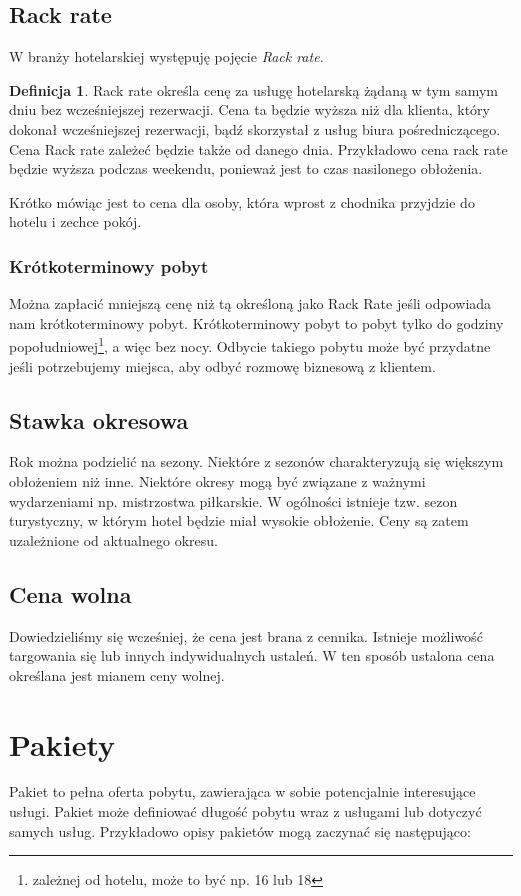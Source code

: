 \documentclass[a4paper,onecolumn,oneside,11pt,wide,floatssmall]{mwrep}
\theoremstyle{definition}
\newtheorem{defn}{Definicja}[section]
\theoremstyle{plain}%
\theoremstyle{remark}
\begin{document}
\subsection{Rack rate}
W branży hotelarskiej występuję pojęcie \emph{Rack rate}.

\begin{defn}{Rack rate}
określa cenę za usługę hotelarską żądaną w tym samym dniu bez wcześniejszej 
rezerwacji. Cena ta będzie wyższa niż dla klienta, który dokonał 
wcześniejszej rezerwacji, bądź skorzystał z usług biura pośredniczącego. 
Cena Rack rate zależeć będzie także od danego dnia. Przykładowo cena rack 
rate będzie wyższa podczas weekendu, ponieważ jest to czas nasilonego 
obłożenia.
\end{defn}

Krótko mówiąc jest to cena dla osoby, która wprost z chodnika przyjdzie do 
hotelu i zechce pokój.

\subsubsection{Krótkoterminowy pobyt}
Można zapłacić mniejszą cenę niż tą określoną jako Rack Rate jeśli odpowiada 
nam krótkoterminowy pobyt. Krótkoterminowy pobyt to pobyt tylko do godziny 
popołudniowej\footnote{zależnej od hotelu, może to być np. 16 lub 18}, a 
więc bez nocy. Odbycie takiego pobytu może być przydatne 
jeśli potrzebujemy miejsca, aby odbyć rozmowę biznesową z klientem. 

\subsection{Stawka okresowa}
Rok można podzielić na sezony. Niektóre z sezonów charakteryzują się 
większym obłożeniem niż inne. Niektóre okresy mogą być związane z ważnymi 
wydarzeniami np. mistrzostwa piłkarskie. W ogólności istnieje tzw. sezon 
turystyczny, w którym hotel będzie miał wysokie obłożenie. Ceny są zatem 
uzależnione od aktualnego okresu.

\subsection{Cena wolna}
Dowiedzieliśmy się wcześniej, że cena jest brana z cennika. Istnieje 
możliwość targowania się lub innych indywidualnych ustaleń. W ten sposób 
ustalona cena określana jest mianem ceny wolnej.

\section{Pakiety}
Pakiet to pełna oferta pobytu, zawierająca w sobie potencjalnie interesujące 
usługi. Pakiet może definiować długość pobytu wraz z usługami lub dotyczyć 
samych usług. Przykładowo opisy pakietów mogą zaczynać się następująco:
\end{document}
